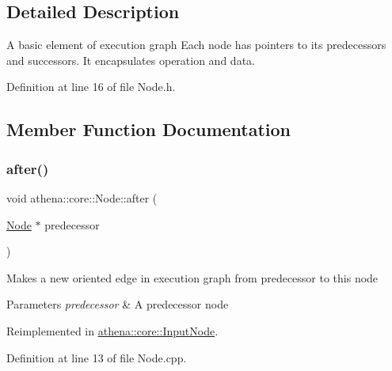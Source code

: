 \subsection{Detailed Description}
A basic element of execution graph Each node has pointers to its predecessors and successors. It encapsulates operation and data. 

Definition at line 16 of file Node.\+h.



\subsection{Member Function Documentation}
\mbox{\label{classathena_1_1core_1_1_node_aefef588463c8e215e998415a7cc6b320}} 
\subsubsection{\texorpdfstring{after()}{after()}}
{\footnotesize\ttfamily void athena\+::core\+::\+Node\+::after (\begin{DoxyParamCaption}\item[{\mbox{\hyperlink{classathena_1_1core_1_1_node}{Node}} $\ast$}]{predecessor }\end{DoxyParamCaption})\hspace{0.3cm}{\ttfamily [virtual]}}

Makes a new oriented edge in execution graph from predecessor to this node 
\begin{DoxyParams}{Parameters}
{\em predecessor} & A predecessor node \\
\hline
\end{DoxyParams}


Reimplemented in \mbox{\hyperlink{classathena_1_1core_1_1_input_node_aaec12f4c76b6d9890efe1fb4337a1b61}{athena\+::core\+::\+Input\+Node}}.



Definition at line 13 of file Node.\+cpp.

\mbox{\label{classathena_1_1core_1_1_node_a6ae012557fc6b29127366b1e92801d4a}} 
